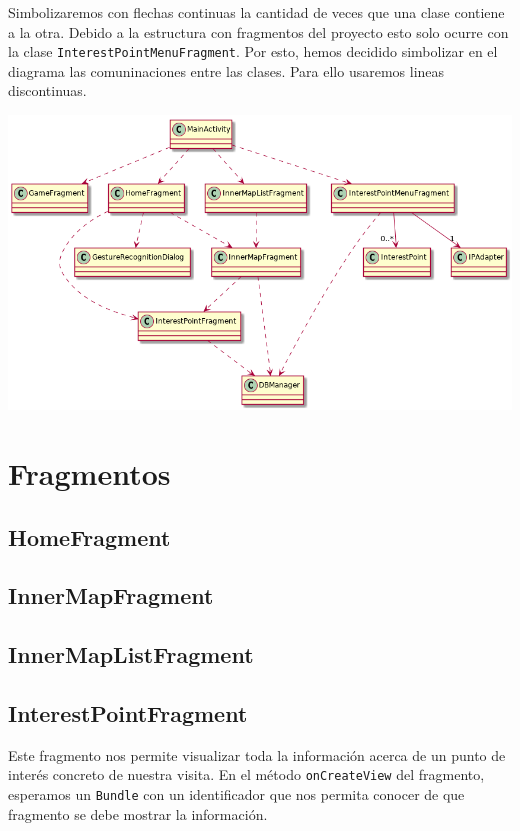 \documentclass[11pt]{article}
\begin{document}
Simbolizaremos con flechas continuas la cantidad de veces que una clase contiene a la otra. Debido a la estructura con fragmentos del proyecto esto solo ocurre con la clase \texttt{InterestPointMenuFragment}. Por esto, hemos decidido simbolizar en el diagrama las comuninaciones entre las clases. Para ello usaremos lineas discontinuas.

\begin{center}
\includegraphics[width=.9\linewidth]{./diagrama2.png}
\end{center}


\section{Fragmentos}
\label{sec:orge6f137c}
\subsection{HomeFragment}
\label{sec:org6f24e37}

\subsection{InnerMapFragment}
\label{sec:org8240bf4}

\subsection{InnerMapListFragment}
\label{sec:orgedf9294}

\subsection{InterestPointFragment}
\label{sec:org27f78a3}

Este fragmento nos permite visualizar toda la información acerca de un punto de interés concreto de nuestra visita. 
En el método \texttt{onCreateView} del fragmento, esperamos un \texttt{Bundle} con un identificador que nos permita conocer de que fragmento se debe mostrar la información.
\end{document}
